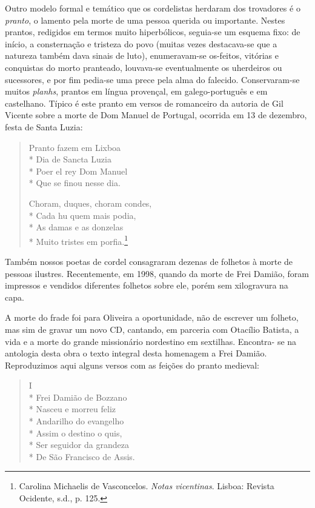 \asterisc

Outro modelo formal e temático que os cordelistas
herdaram dos trovadores é o \textit{pranto}, o lamento pela morte de
uma pessoa querida ou importante. Nestes prantos, redigidos
em termos muito hiperbólicos, seguia-se um esquema fixo:
de início, a consternação e tristeza do povo (muitas vezes
destacava-se que a natureza também dava sinais de luto),
enumeravam-se os-feitos, vitórias e conquistas do morto
pranteado, louvava-se eventualmente os uherdeiros ou
sucessores, e por fim pedia-se uma prece pela alma do falecido.
Conservaram-se muitos \textit{planhs}, prantos em língua provençal,
em galego-português e em castelhano. Típico é este pranto
em versos de romanceiro da autoria de Gil Vicente sobre a
morte de Dom Manuel de Portugal, ocorrida em 13 de
dezembro, festa de Santa Luzia:

\begin{verse}

Pranto fazem em Lixboa\\*
Dia de Sancta Luzia\\*
Poer el rey Dom Manuel\\*
Que se finou nesse dia.

Choram, duques, choram condes,\\*
Cada hu quem mais podia,\\*
As damas e as donzelas\\*
Muito tristes em porfia.\footnote{ Carolina Michaelis de Vasconcelos.
\textit{Notas vicentinas}. Lisboa: Revista Ocidente, s.d., p. 125.}

\end{verse}

Também nossos poetas de cordel consagraram dezenas 
de folhetos à morte de pessoas ilustres. Recentemente, em
1998, quando da morte de Frei Damião, foram impressos
e vendidos diferentes folhetos sobre ele, porém sem
xilogravura na capa.

A morte do frade foi para Oliveira a oportunidade, não
de escrever um folheto, mas sim de gravar um novo CD,
cantando, em parceria com Otacílio Batista, a vida e a morte
do grande missionário nordestino em sextilhas. Encontra-
se na antologia desta obra o texto integral desta
homenagem a Frei Damião. Reproduzimos aqui alguns
versos com as feições do pranto medieval:

\begin{verse}

I\\*
Frei Damião de Bozzano\\*
Nasceu e morreu feliz\\*
Andarilho do evangelho\\*
Assim o destino o quis,\\*
Ser seguidor da grandeza\\*
De São Francisco de Assis.

\end{verse}

